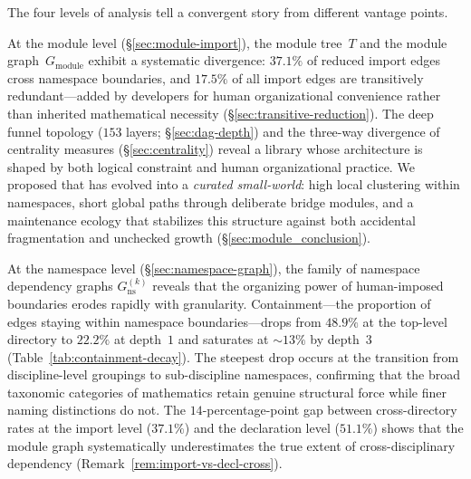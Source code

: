 The four levels of analysis tell a convergent story from different vantage points.

At the module level (\S\ref{sec:module-import}), the module tree~$T$ and the module graph~$G_{\mathrm{module}}$ exhibit a systematic divergence: $37.1\%$ of reduced import edges cross namespace boundaries, and $17.5\%$ of all import edges are transitively redundant---added by developers for human organizational convenience rather than inherited mathematical necessity (\S\ref{sec:transitive-reduction}). The deep funnel topology ($153$ layers; \S\ref{sec:dag-depth}) and the three-way divergence of centrality measures (\S\ref{sec:centrality}) reveal a library whose architecture is shaped by both logical constraint and human organizational practice. We proposed that  has evolved into a \emph{curated small-world}: high local clustering within namespaces, short global paths through deliberate bridge modules, and a maintenance ecology that stabilizes this structure against both accidental fragmentation and unchecked growth (\S\ref{sec:module_conclusion}).

At the namespace level (\S\ref{sec:namespace-graph}), the family of namespace dependency graphs $G_{\mathrm{ns}}^{(k)}$ reveals that the organizing power of human-imposed boundaries erodes rapidly with granularity. Containment---the proportion of edges staying within namespace boundaries---drops from $48.9\%$ at the top-level directory to $22.2\%$ at depth~$1$ and saturates at ${\sim}13\%$ by depth~$3$ (Table~\ref{tab:containment-decay}). The steepest drop occurs at the transition from discipline-level groupings to sub-discipline namespaces, confirming that the broad taxonomic categories of mathematics retain genuine structural force while finer naming distinctions do not. The $14$-percentage-point gap between cross-directory rates at the import level ($37.1\%$) and the declaration level ($51.1\%$) shows that the module graph systematically underestimates the true extent of cross-disciplinary dependency (Remark~\ref{rem:import-vs-decl-cross}).

